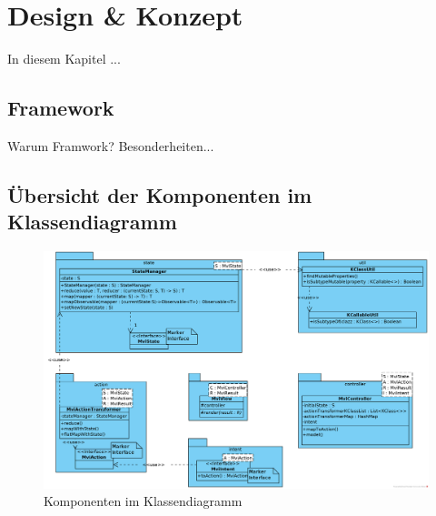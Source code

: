 \section{Design \& Konzept}
\label{sec:design-und-konzept}
In diesem Kapitel ...

\subsection{Framework}
Warum Framwork? Besonderheiten...

\subsection{Übersicht der Komponenten im Klassendiagramm}
\begin{figure}
		\includegraphics[width=\textwidth]{./images/framework-class-diagram}
		\caption{Komponenten im Klassendiagramm}
\end{figure}
\clearpage
